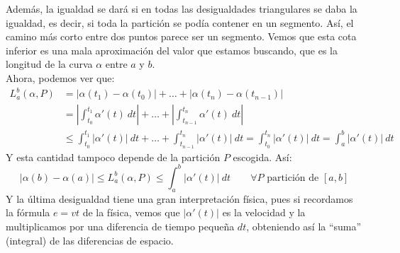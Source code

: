 \noindent
Además, la igualdad se dará si en todas las desigualdades triangulares se daba la igualdad, es decir, si toda la partición se podía contener en un segmento. Así, el camino más corto entre dos puntos parece ser un segmento. Vemos que esta cota inferior es una mala aproximación del valor que estamos buscando, que es la longitud de la curva $\alpha$ entre $a$ y $b$.\\

\noindent
Ahora, podemos ver que:
\begin{align*}
    L^b_a(\alpha,P) &= |\alpha(t_1) - \alpha(t_0)| + \ldots + |\alpha(t_n) - \alpha(t_{n-1})| \\
                    &= \left|\int_{t_0}^{t_1} \alpha'(t)~dt \right| + \ldots + \left|\int_{t_{n-1}}^{t_n} \alpha'(t)~dt \right| \\
                    &\leq \int_{t_0}^{t_1} |\alpha'(t)|~dt  + \ldots + \int_{t_{n-1}}^{t_n} |\alpha'(t)|~dt = \int_{t_0}^{t_n} |\alpha'(t)|~dt  = \int_{a}^{b} |\alpha'(t)|~dt 
\end{align*}
Y esta cantidad tampoco depende de la partición $P$ escogida. Así:
\begin{equation*}
    |\alpha(b) - \alpha(a)| \leq L_a^b(\alpha,P) \leq \int_{a}^{b} |\alpha'(t)|~dt  \qquad \forall P \text{\ partición de\ } [a,b]
\end{equation*}
Y la última desigualdad tiene una gran interpretación física, pues si recordamos la fórmula $e=vt$ de la física, vemos que $|\alpha'(t)|$ es la velocidad y la multiplicamos por una diferencia de tiempo pequeña $dt$, obteniendo así la ``suma'' (integral) de las diferencias de espacio. \\

